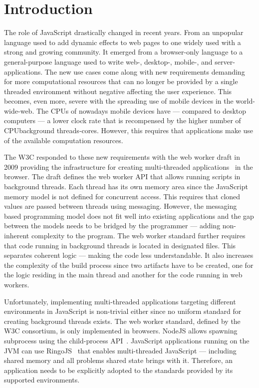\section{Introduction}\label{sec:introduction}
The role of JavaScript drastically changed in recent years. From an unpopular language used to add dynamic effects to web pages to one widely used with a strong and growing community. It emerged from a browser-only language to a general-purpose language used to write web-, desktop-, mobile-, and server-applications. The new use cases come along with new requirements demanding for more computational resources that can no longer be provided by a single threaded environment without negative affecting the user experience. This becomes, even more, severe with the spreading use of mobile devices in the world-wide-web. The CPUs of nowadays mobile devices have  --- compared to desktop computers --- a lower clock rate that is recompensed by the higher number of CPUbackground threads-cores. However, this requires that applications make use of the available computation resources. 

The W3C responded to these new requirements with the web worker draft in 2009 providing the infrastructure for creating multi-threaded applications~\cite{w3cWebWorker} in the browser. The draft defines the web worker API that allows running scripts in background threads. Each thread has its own memory area since the JavaScript memory model is not defined for concurrent access. This requires that cloned values are passed between threads using messaging. However, the messaging based programming model does not fit well into existing applications and the gap between the models needs to be bridged by the programmer --- adding non-inherent complexity to the program. The web worker standard further requires that code running in background threads is located in designated files. This separates coherent logic --- making the code less understandable. It also increases the complexity of the build process since two artifacts have to be created, one for the logic residing in the main thread and another for the code running in web workers. 

Unfortunately, implementing multi-threaded applications targeting different environments in JavaScript is non-trivial either since no uniform standard for creating background threads exists. The web worker standard, defined by the W3C consortium, is only implemented in browsers. NodeJS allows spawning subprocess using the child-process API~\cite{childProcess}. JavaScript applications running on the JVM can use RingoJS~\cite{RingoJS} that enables multi-threaded JavaScript --- including shared memory and all problems shared state brings with it. Therefore, an application needs to be explicitly adopted to the standards provided by its supported environments.

